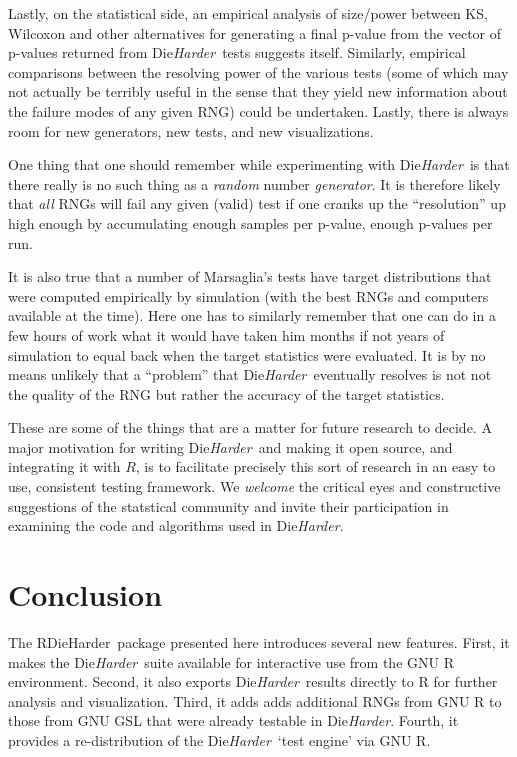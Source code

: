 \documentclass[12pt]{article}
\newcommand{\pkg}[1]{{\normalfont\fontseries{b}\selectfont #1}}
\newcommand{\dieharder}{\textrm{Die}\textsl{Harder}}
\newcommand{\rdieharder}{\pkg{RDieHarder}}
\begin{document}
Lastly, on the statistical side, an empirical analysis of size/power
between KS, Wilcoxon and other alternatives for generating a final
p-value from the vector of p-values returned from \dieharder\ tests
suggests itself. Similarly, empirical comparisons between the resolving
power of the various tests (some of which may not actually be terribly
useful in the sense that they yield new information about the failure
modes of any given RNG) could be undertaken.  Lastly, there is always
room for new generators, new tests, and new visualizations.

One thing that one should remember while experimenting with \dieharder\ is
that there really is no such thing as a {\em random} number {\em
generator}.  It is therefore likely that {\em all} RNGs will fail any
given (valid) test if one cranks up the ``resolution'' up high enough by
accumulating enough samples per p-value, enough p-values per run.  

It is also true that a number of Marsaglia's tests have target
distributions that were computed empirically by simulation (with the
best RNGs and computers available at the time).  Here one has to
similarly remember that one can do in a few hours of work what it would
have taken him months if not years of simulation to equal back when the
target statistics were evaluated.  It is by no means unlikely that a
``problem'' that \dieharder\ eventually resolves is not not the quality of
the RNG but rather the accuracy of the target statistics.

These are some of the things that are a matter for future research
to decide.  A major motivation for writing \dieharder\, and making it open
source, and integrating it with $R$, is to facilitate precisely this
sort of research in an easy to use, consistent testing framework.  We
{\em welcome} the critical eyes and constructive suggestions of the
statstical community and invite their participation in examining the
code and algorithms used in \dieharder.

\section{Conclusion}

The \rdieharder\ package presented here introduces several new features.
First, it makes the \dieharder\ suite \citep{Brown:dieharder:2007} available
for interactive use from the GNU R environment. Second, it also exports
\dieharder\ results directly to R for further analysis and visualization.
Third, it adds adds additional RNGs from GNU R to those from GNU GSL that
were already testable in \dieharder. Fourth, it provides a re-distribution of
the \dieharder\ `test engine' via GNU R.



\end{document}

